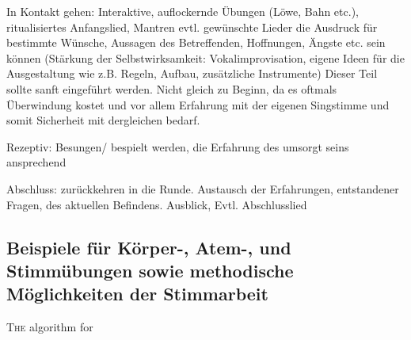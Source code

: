 In Kontakt gehen: 
Interaktive, auflockernde Übungen (Löwe, Bahn etc.), ritualisiertes Anfangslied, Mantren evtl. gewünschte Lieder die Ausdruck für bestimmte Wünsche, Aussagen des Betreffenden, Hoffnungen, Ängste etc. sein können
(Stärkung der Selbstwirksamkeit: Vokalimprovisation, eigene Ideen für die Ausgestaltung wie z.B. Regeln, Aufbau, zusätzliche Instrumente) Dieser Teil sollte sanft eingeführt werden. Nicht gleich zu Beginn, da es oftmals Überwindung kostet und vor allem Erfahrung mit der eigenen Singstimme und somit Sicherheit mit dergleichen bedarf.

Rezeptiv: 
Besungen/ bespielt werden, die Erfahrung des umsorgt seins ansprechend

Abschluss: 
zurückkehren in die Runde. Austausch der Erfahrungen, entstandener Fragen, des aktuellen Befindens. Ausblick, Evtl. Abschlusslied


\subsection{Beispiele für Körper-, Atem-, und Stimmübungen sowie methodische Möglichkeiten der Stimmarbeit}



\ifpdf
    \graphicspath{{5_konzept/figures/PNG/}{5_konzept/figures/PDF/}{5_konzept/figures/}}
\else
    \graphicspath{{5_konzept/figures/EPS/}{5_konzept/figures/}}
\fi

\lettrine{T}{he} algorithm for

\newpage\thispagestyle{empty}
